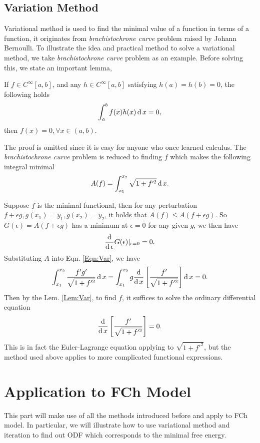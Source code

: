 \subsection{Variation Method}
Variational method is used to find the minimal value of a function in terms of a function, it originates from \textit{brachistochrone curve} problem raised by Johann Bernoulli. To illustrate the idea and practical method to solve a variational method, we take \textit{brachistochrone curve} problem as an example. Before solving this, we state an important lemma,
\begin{lemma}
	If $f\in C^{\infty}[a,b]$, and any $h\in C^{\infty}[a,b]$ satisfying $h(a)=h(b)=0$, the following holds
	$$
	\int_a^bf(x)h(x)\operatorname{d} x=0,
	$$
	then $f(x)=0, \forall x\in (a,b)$.
\end{lemma}\label{Lem:Var}
The proof is omitted since it is easy for anyone who once learned calculus. The \textit{brachistochrone curve} problem is reduced to finding $f$ which makes the following integral minimal
\begin{equation}
	A(f)=\int_{x_{1}}^{x_{2}} \sqrt{1+f'^2} \operatorname{d}x.
\end{equation}

Suppose $f$ is the minimal functional, then for any perturbation $f+\epsilon g, g(x_1)=y_1, g(x_2)=y_2$, it holds that $A(f)\leq A(f+\epsilon g)$. So $G(\epsilon) = A(f+\epsilon g)$ has a minimum at $\epsilon = 0$ for any given $g$, we then have
\begin{equation}\label{Eqn:Var}
	\frac{\operatorname{d}}{\operatorname{d}\epsilon}G(\epsilon)|_{\epsilon=0}=0.
\end{equation}
Substituting $A$ into Eqn. \ref{Eqn:Var}, we have
\begin{equation}
	\int_{x_{1}}^{x_{2}} \frac{f'g'}{\sqrt{1+f'^2}} \operatorname{d} x = \int_{x_{1}}^{x_{2}} g \frac{\operatorname{d}}{\operatorname{d}x}\left[\frac{f'}{\sqrt{1+f'^2}}\right]\operatorname{d}x=0.
\end{equation}
Then by the Lem. \ref{Lem:Var}, to find $f$, it suffices to solve the ordinary differential equation
\begin{equation}
	\frac{\operatorname{d}}{\operatorname{d}x}\left[\frac{f'}{\sqrt{1+f'^2}}\right]=0.
\end{equation}
This is in fact the Euler-Lagrange equation applying to $\sqrt{1+f'^2}$, but the method used above applies to more complicated functional expressions.

\section{Application to FCh Model}
This part will make use of all the methods introduced before and apply to FCh model. In particular, we will illustrate how to use variational method and iteration to find out ODF which corresponds to the minimal free energy.

